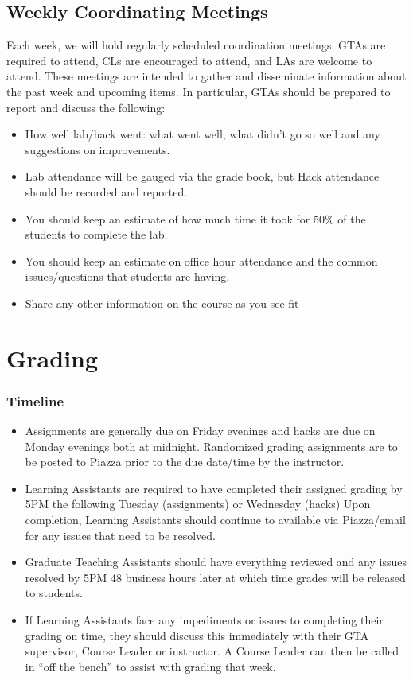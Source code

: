 \documentclass[12pt]{scrartcl}
\begin{document}
\subsection*{Weekly Coordinating Meetings}

Each week, we will hold regularly scheduled coordination meetings.  GTAs are
required to attend, CLs are encouraged to attend, and LAs are welcome to attend.
These meetings are intended to gather and disseminate information about the past
week and upcoming items.  In particular, GTAs should be prepared to report and
discuss the following:
\begin{itemize}
  \item How well lab/hack went: what went well, what didn't go so well and any
  suggestions on improvements.
  \item Lab attendance will be gauged via the grade book, but Hack attendance 
  should be recorded and reported.
  \item You should keep an estimate of how much time it took for 50\% of the
  students to complete the lab.
  \item You should keep an estimate on office hour attendance and the common
  issues/questions that students are having.
  \item Share any other information on the course as you see fit
\end{itemize}

\section*{Grading}

\subsubsection*{Timeline}

\begin{itemize}
  \item Assignments are generally due on Friday evenings and hacks are 
    due on Monday evenings both at midnight.  Randomized grading assignments are to 
    be posted to Piazza prior to the due date/time by the instructor.
  \item Learning Assistants are required to have completed their assigned
    grading by 5PM the following Tuesday (assignments) or Wednesday (hacks)
    Upon completion, Learning Assistants should continue to available via
    Piazza/email for any issues that need to be resolved.
  \item Graduate Teaching Assistants should have everything reviewed and
    any issues resolved by 5PM 48 business hours later at which time grades
    will be released to students.
  \item If Learning Assistants face any impediments or issues to completing
    their grading on time, they should discuss this immediately with their GTA
    supervisor, Course Leader or instructor.  A Course Leader can then be called
    in ``off the bench'' to assist with grading that week.
\end{itemize}
\end{document}
